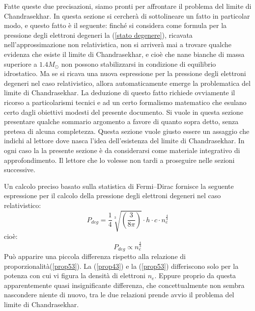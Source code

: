Fatte queste due precisazioni, siamo pronti per affrontare il problema del limite di Chandrasekhar. In questa sezione si cercher\`{a} di sottolineare un fatto in particolar modo, e questo fatto \`{e} il seguente: finch\'{e} si considera come formula per la pressione degli elettroni degeneri la (\ref{stato degenere}), ricavata nell'approssimazione non relativistica, non si arriver\`{a} mai a trovare qualche evidenza che esiste il limite di Chandrasekhar, e cio\`{e} che nane bianche di massa superiore a $1.4 M_{\odot}$ non possono stabilizzarsi in condizione di equilibrio idrostatico. Ma se si ricava una nuova espressione per la pressione degli elettroni degeneri nel caso relativistico, allora automaticamente emerge la problematica del limite di Chandrasekhar. La deduzione di questo fatto richiede ovviamente il ricorso a particolarismi tecnici e ad un certo formalismo matematico che esulano certo dagli obiettivi modesti del presente documento. Si vuole in questa sezione presentare qualche sommario argomento a favore di quanto sopra detto, senza pretesa di alcuna completezza. Questa sezione vuole giusto essere un assaggio che indichi al lettore dove nasca l'idea dell'esistenza del limite di Chandrasekhar. In ogni caso la la presente sezione \`{e} da considerarsi come materiale integrativo di approfondimento. Il lettore che lo volesse non tardi a proseguire nelle sezioni successive.
\par
Un calcolo preciso basato sulla statistica di Fermi--Dirac fornisce la seguente espressione per il calcolo della pressione degli elettroni degeneri nel caso relativistico:
\begin{equation}
P_{deg}=\frac{1}{4} \sqrt[3]{\left( \frac{3}{8\pi} \right)} \cdot h \cdot c\cdot n_{e}^{\frac{4}{3}}
\end{equation}
cio\`{e}:
\begin{equation}\label{prop43}
P_{deg} \propto n_{e}^{\frac{4}{3}}
\end{equation}
Pu\`{o} apparire una piccola differenza rispetto alla relazione di proporzionalit\`{a}(\ref{prop53}). La (\ref{prop43}) e la (\ref{prop53}) differiscono solo per la potenza con cui vi figura la densit\`{a} di elettroni $n_{e}$. Eppure proprio da questa apparentemente quasi insignificante differenza, che concettualmente non sembra nascondere niente di nuovo, tra le due relazioni prende avvio il problema del limite di Chandrasekhar.
